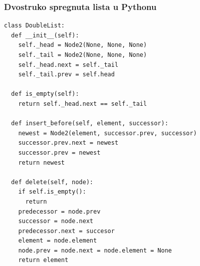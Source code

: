 \documentclass[compress]{beamer}
\begin{document}
\begin{frame}
  \frametitle{Dvostruko spregnuta lista u Pythonu}
\begin{verbatim}
class DoubleList:
  def __init__(self):
    self._head = Node2(None, None, None)
    self._tail = Node2(None, None, None)
    self._head.next = self._tail
    self._tail.prev = self.head
  
  def is_empty(self):
    return self._head.next == self._tail
    
  def insert_before(self, element, successor):
    newest = Node2(element, successor.prev, successor)
    successor.prev.next = newest
    successor.prev = newest
    return newest
    
  def delete(self, node):
    if self.is_empty():
      return
    predecessor = node.prev
    successor = node.next
    predecessor.next = succesor
    element = node.element
    node.prev = node.next = node.element = None
    return element
\end{verbatim}
\end{frame}
\end{document}
